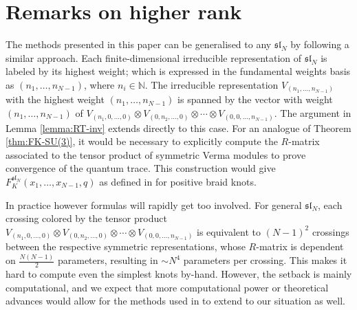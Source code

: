 \documentclass[12pt,oneside,reqno]{amsart}
\def\N{\mathbb{N}}
\numberwithin{teorema}{section}
\numberwithin{definicion}{section}
\numberwithin{lema}{section}
\numberwithin{conjetura}{section}
\numberwithin{proposicion}{section}
\def\sl{\mathfrak{sl}}
\begin{document}
\section{Remarks on higher rank}\label{sec:remarks-higher-rank}

The methods presented in this paper can be generalised to any $\sl_N$ by following a similar approach. Each finite-dimensional irreducible representation of $\sl_N$ is labeled by its highest weight; which is expressed in the fundamental weights basis as $(n_1,\dots,n_{N-1})$, where $n_i\in\N$. The irreducible representation $V_{(n_1,\dots,n_{N-1})}$ with the highest weight $(n_1,\dots,n_{N-1})$ is spanned by the vector with weight $(n_1,\dots,n_{N-1})$ of $V_{(n_1,0,\dots,0)}\otimes V_{(0,n_2,\dots,0)}\otimes\cdots\otimes V_{(0,0,\dots,n_{N-1})}$. The argument in Lemma \ref{lemma:RT-inv} extends directly to this case. For an analogue of Theorem \ref{thm:FK-SU(3)}, it would be necessary to explicitly compute the $R$-matrix associated to the tensor product of symmetric Verma modules to prove convergence of the quantum trace. This construction would give $F_K^{\sl_N}(x_1,\dots, x_{N-1},q)$ as defined in \cite{Park20} for positive braid knots.

In practice however formulas will rapidly get too involved. For general $\sl_N$, each crossing colored by the tensor product $V_{(n_1,0,\dots,0)}\otimes V_{(0,n_2,\dots,0)}\otimes\cdots\otimes V_{(0,0,\dots,n_{N-1})}$ is equivalent to $(N-1)^2$ crossings between the respective symmetric representations, whose $R$-matrix is dependent on $\frac{N(N-1)}{2}$ parameters, resulting in $\sim N^4$ parameters per crossing. This makes it hard to compute even the simplest knots by-hand. However, the setback is mainly computational, and we expect that more computational power or theoretical advances would allow for the methods used in \cite{gruen22} to extend to our situation as well.



\end{document}
